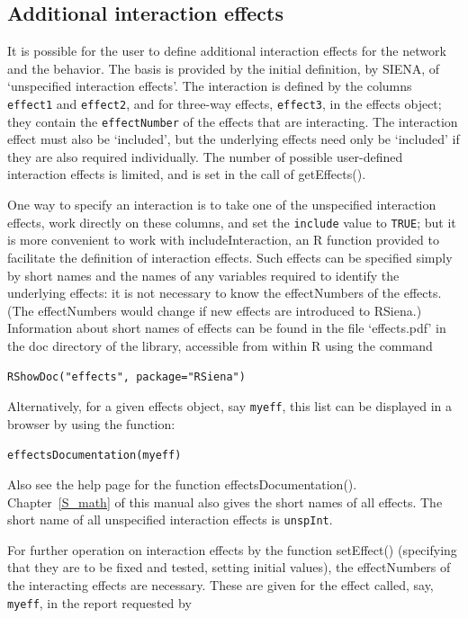 \documentclass[a4paper,fleqn,11pt]{article}
\newcommand{\+}{\, + \,}
\newcommand{\sfn}[1]{\textsf{#1}}
\newcommand{\R}{{\sf R }}
\newcommand{\rs}{{\sf RSiena}}
\newcommand{\si}{{\sf SIENA}}
\begin{document}
\hypertarget{T_int_eff}{
\subsection{Additional interaction effects}
}
\label{S_int_eff}

It is possible for the user to define additional interaction effects for the
network and the behavior.
The basis is provided by the initial definition, by \si, of `unspecified
interaction effects'.
The interaction is defined by
the columns \texttt{effect1} and \texttt{effect2},
and for three-way effects, \texttt{effect3},
in the effects object; they contain the \texttt{effectNumber}
of the effects that are interacting.
The interaction effect must also be `included',
but the underlying effects need only be `included' if
they are also required individually.
The number of possible user-defined interaction effects is limited,
and is set in the call of \sfn{getEffects()}.

One way to specify an interaction is to take one of the unspecified
interaction effects, work directly on these columns,
and set the \texttt{include} value to \texttt{TRUE};
but it is more convenient to work with \sfn{includeInteraction},
an \R function provided to facilitate the definition
of interaction effects. Such effects can be specified simply by short names and
the names of any variables required to identify the underlying effects: it is
not necessary to know the effectNumbers of the effects. (The effectNumbers would
change if new effects are introduced to \rs.) Information about short names of
effects can be found in the file `effects.pdf' in the doc directory of the
library, accessible from within \R using the command

\verb|RShowDoc("effects", package="RSiena")|

\noindent
Alternatively, for a given effects object, say \texttt{myeff},
this list can be displayed in a browser by using the function:

\verb|effectsDocumentation(myeff)|

\noindent
Also see the help page for the function \sfn{effectsDocumentation()}.
Chapter~\ref{S_math} of this manual also gives the short names of all effects.
The short name of all unspecified interaction effects is \texttt{unspInt}.

For further operation on interaction effects by the function \sfn{setEffect()}
(specifying that they  are to be fixed and tested, setting initial values),
the effectNumbers of the interacting effects are necessary.
These are given for the effect called, say, \texttt{myeff}, in
the report requested by
\end{document}
